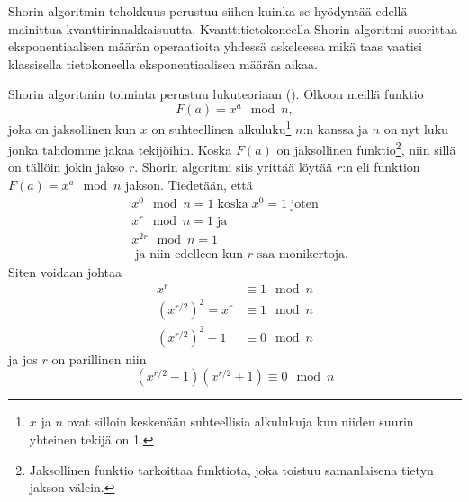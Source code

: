 Shorin algoritmin tehokkuus perustuu siihen kuinka se hyödyntää edellä mainittua kvanttirinnakkaisuutta. Kvanttitietokoneella Shorin algoritmi suorittaa eksponentiaalisen määrän operaatioita yhdessä askeleessa mikä taas vaatisi klassisella tietokoneella eksponentiaalisen määrän aikaa.

\iffalse
Shorin algoritmin toiminta perustuu lukuteoriaan (\cite{hayward2008quantum}). Olkoon meillä funktio \[F(a) = x^{a} \mod n\]
joka on jaksollinen\footnote{Jaksollinen funktio tarkoittaa funktiota, joka toistuu samanlaisena tietyn jakson välein.} kun $x$ on suhteellinen alkuluku\footnote{ks. kappale 2.2.} $n$:n kanssa ja $n$ on nyt luku jonka haluamme jakaa tekijöihin. Koska $F(a)$ on jaksollinen niin sillä on tällöin jokin jakso $r$. 
\fi

Shorin algoritmin toiminta perustuu lukuteoriaan (\cite{hayward2008quantum}). %
Olkoon meillä funktio
\begin{equation}
    \label{eq1}
    F(a) = x^{a} \mod n,
\end{equation}
joka on jaksollinen kun $x$ on suhteellinen alkuluku\footnote{$x$ ja $n$ ovat silloin keskenään suhteellisia alkulukuja kun niiden suurin yhteinen tekijä on 1.} $n$:n kanssa ja $n$ on nyt luku jonka tahdomme jakaa tekijöihin. Koska $F(a)$ on jaksollinen funktio\footnote{Jaksollinen funktio tarkoittaa funktiota, joka toistuu samanlaisena tietyn jakson välein.}, niin sillä on tällöin jokin jakso $r$. Shorin algoritmi siis yrittää löytää $r$:n eli funktion $F(a) = x^{a} \mod n$ jakson. Tiedetään, että 
\begin{equation}
    \label{eq2}
    \begin{split}
    & x^{0} \mod n = 1 \; \text{koska} \;  x^0 = 1 \; \text{joten} \\
    & x^{r} \mod n = 1 \; \text{ja} \\
    & x^{2r} \mod n = 1 \\
    & \; \text{ja niin edelleen kun $r$ saa monikertoja.}
    \end{split}
\end{equation}
Siten voidaan johtaa
\begin{equation}
    \label{eq3}
    \begin{split}
    x^{r} & \equiv 1 \mod n \\
    (x^{r/2})^{2} = x^{r} & \equiv 1 \mod n \\
    (x^{r/2})^{2} - 1 & \equiv 0 \mod n
    \end{split}
\end{equation}
ja jos $r$ on parillinen niin
\begin{equation}
    \label{eq4}
    (x^{r/2} - 1)(x^{r/2} + 1) \equiv 0 \mod n
\end{equation}

